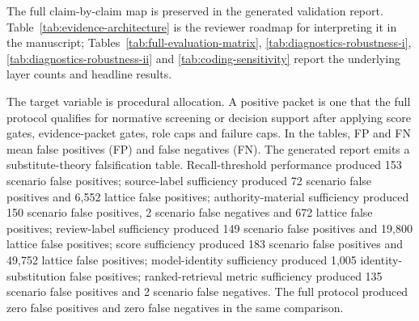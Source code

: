 \documentclass[12pt,a4paper]{article}
\begin{document}
The full claim-by-claim map is preserved in the generated validation report. Table~\ref{tab:evidence-architecture} is the reviewer roadmap for interpreting it in the manuscript; Tables~\ref{tab:full-evaluation-matrix}, \ref{tab:diagnostics-robustness-i}, \ref{tab:diagnostics-robustness-ii} and \ref{tab:coding-sensitivity} report the underlying layer counts and headline results.

The target variable is procedural allocation. A positive packet is one that the full protocol qualifies for normative screening or decision support after applying score gates, evidence-packet gates, role caps and failure caps. In the tables, FP and FN mean false positives (FP) and false negatives (FN). The generated report emits a substitute-theory falsification table. Recall-threshold performance produced 153 scenario false positives; source-label sufficiency produced 72 scenario false positives and 6,552 lattice false positives; authority-material sufficiency produced 150 scenario false positives, 2 scenario false negatives and 672 lattice false positives; review-label sufficiency produced 149 scenario false positives and 19,800 lattice false positives; score sufficiency produced 183 scenario false positives and 49,752 lattice false positives; model-identity sufficiency produced 1,005 identity-substitution false positives; ranked-retrieval metric sufficiency produced 135 scenario false positives and 2 scenario false negatives. The full protocol produced zero false positives and zero false negatives in the same comparison.
\end{document}
